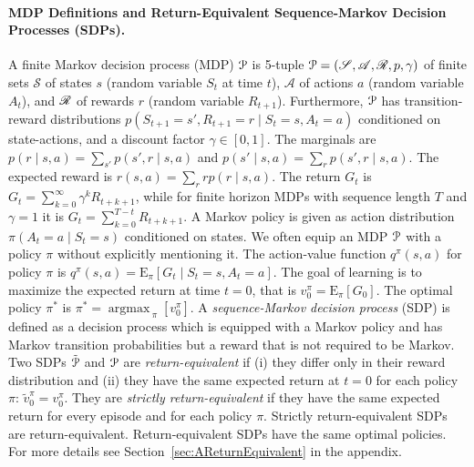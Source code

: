 \documentclass{article}
\newcommand{\sA}{\mathscr{A}} \newcommand{\sB}{\mathscr{B}}
\newcommand{\sS}{\mathscr{S}} \newcommand{\sT}{\mathscr{T}}
\newcommand\EXP{\mathbf{\mathrm{E}}}
\newcommand\argmax{\mathop{\mathrm{argmax}\,}}
\begin{document}
\paragraph{MDP Definitions and 
           Return-Equivalent Sequence-Markov Decision Processes (SDPs).}
\label{c:def}
A finite Markov decision process (MDP) $\mathcal{P}$
is 5-tuple $\cP=(\sS,\sA,\sR,p,\gamma )$ of finite sets
$\sS$ of states $s$ (random variable $S_t$ at time $t$),
$\sA$ of actions $a$ (random variable $A_t$),
and $\mathscr{R}$ of rewards $r$ (random variable $R_{t+1}$).
Furthermore, $\mathcal{P}$ has
transition-reward distributions
$p(S_{t+1}=s',R_{t+1}=r \mid S_t=s,A_t=a)$
conditioned on state-actions, and a discount factor $\gamma \in [0, 1]$.
The marginals are $p(r\mid s,a) = \sum_{s'}p(s',r\mid s,a)$ and 
$p(s'\mid s,a) = \sum_{r}p(s',r\mid s,a)$.
The expected reward is $r(s,a) = \sum_{r} r  p(r\mid s,a)$.
The return $G_t$ is $G_t =  \sum_{k=0}^{\infty}  \gamma^k  R_{t+k+1}$,
while for finite horizon MDPs with sequence
length $T$ and $\gamma=1$ it is $G_t = \sum_{k=0}^{T-t}  R_{t+k+1}$.
A Markov policy is given as
action distribution $\pi(A_t=a \mid S_t=s)$ conditioned on
states.
We often equip an MDP $\mathcal{P}$ with a policy $\pi$ 
without explicitly mentioning it. 
The action-value function $q^{\pi}(s,a)$ for policy $\pi$ is 
$q^{\pi}(s,a) = \EXP_{\pi} \left[ G_t \mid S_t=s, A_t=a \right]$.
The goal of learning is to maximize the expected return at time $t=0$,
that is $v^{\pi}_0=\EXP_{\pi} \left[G_0\right]$.
The optimal policy $\pi^{*}$ is $\pi^{*} = \argmax_{\pi}[v_0^{\pi}]$.
A {\em sequence-Markov decision process} (SDP) is defined 
as a decision process which is equipped with a Markov policy
and has Markov transition probabilities
but a reward that is not required to be Markov.
Two SDPs $\tilde{\mathcal{P}}$ and $\mathcal{P}$
are {\em return-equivalent} if
(i) they differ only in their reward distribution  
and (ii) they
have the same expected return at $t=0$ for each policy $\pi$:
$\tilde{v}^{\pi}_0=v^{\pi}_0$. 
They are {\em strictly return-equivalent} if
they have the same expected return for every episode and
for each policy $\pi$.
Strictly return-equivalent SDPs are return-equivalent.
Return-equivalent SDPs have the same optimal policies.
For more details see Section~\ref{sec:AReturnEquivalent} in the appendix.
\end{document}
